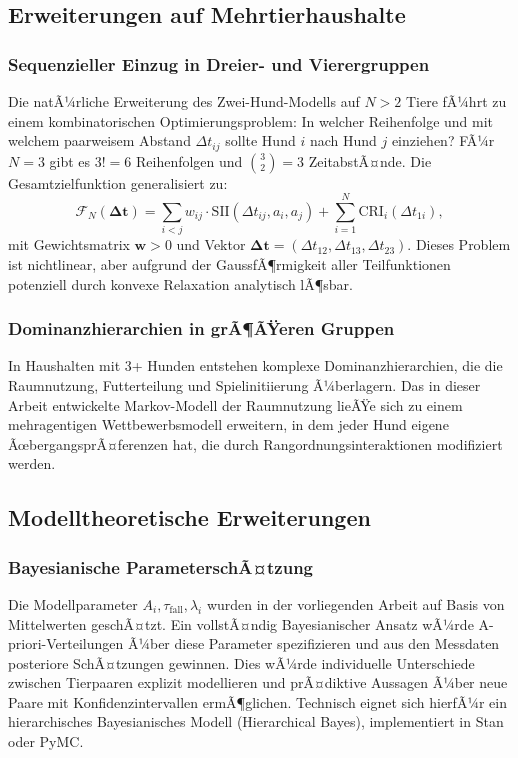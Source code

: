 ﻿\documentclass[12pt, a4paper]{article}
\theoremstyle{plain}
\theoremstyle{definition}
\theoremstyle{remark}
\newcommand{\SII}{\mathrm{SII}}
\newcommand{\CRI}{\mathrm{CRI}}
\newcommand{\dt}{\Delta t}
\begin{document}
\subsection{Erweiterungen auf Mehrtierhaushalte}

\subsubsection{Sequenzieller Einzug in Dreier- und Vierergruppen}

Die natÃ¼rliche Erweiterung des Zwei-Hund-Modells auf $N > 2$ Tiere fÃ¼hrt zu
einem kombinatorischen Optimierungsproblem: In welcher Reihenfolge und mit
welchem paarweisem Abstand $\dt_{ij}$ sollte Hund $i$ nach Hund $j$ einziehen?
FÃ¼r $N = 3$ gibt es $3! = 6$ Reihenfolgen und $\binom{3}{2} = 3$
ZeitabstÃ¤nde. Die Gesamtzielfunktion generalisiert zu:
\begin{equation}
  \mathcal{F}_N(\bm{\dt}) = \sum_{i<j} w_{ij} \cdot \SII(\dt_{ij}, a_i, a_j) + \sum_{i=1}^N \CRI_i(\dt_{1i}),
\end{equation}
mit Gewichtsmatrix $\bm{w} > 0$ und Vektor $\bm{\dt} = (\dt_{12}, \dt_{13}, \dt_{23})$.
Dieses Problem ist nichtlinear, aber aufgrund der GaussfÃ¶rmigkeit aller Teilfunktionen
potenziell durch konvexe Relaxation analytisch lÃ¶sbar.

\subsubsection{Dominanzhierarchien in grÃ¶ÃŸeren Gruppen}

In Haushalten mit 3+ Hunden entstehen komplexe Dominanzhierarchien, die die
Raumnutzung, Futterteilung und Spielinitiierung Ã¼berlagern. Das in dieser
Arbeit entwickelte Markov-Modell der Raumnutzung lieÃŸe sich zu einem
mehragentigen Wettbewerbsmodell erweitern, in dem jeder Hund eigene
ÃœbergangsprÃ¤ferenzen hat, die durch Rangordnungsinteraktionen modifiziert
werden.

\subsection{Modelltheoretische Erweiterungen}

\subsubsection{Bayesianische ParameterschÃ¤tzung}

Die Modellparameter $A_i, \tau_{\mathrm{fall}}, \lambda_i$ wurden in der
vorliegenden Arbeit auf Basis von Mittelwerten geschÃ¤tzt. Ein vollstÃ¤ndig
Bayesianischer Ansatz wÃ¼rde A-priori-Verteilungen Ã¼ber diese Parameter
spezifizieren und aus den Messdaten posteriore SchÃ¤tzungen gewinnen.
Dies wÃ¼rde individuelle Unterschiede zwischen Tierpaaren explizit modellieren
und prÃ¤diktive Aussagen Ã¼ber neue Paare mit Konfidenzintervallen ermÃ¶glichen.
Technisch eignet sich hierfÃ¼r ein hierarchisches Bayesianisches Modell
(Hierarchical Bayes), implementiert in Stan oder PyMC.
\end{document}
